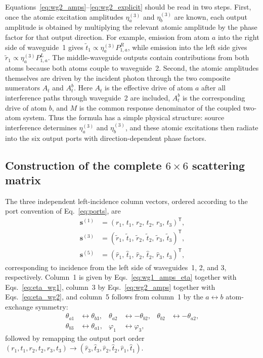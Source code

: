 \documentclass[aps,pra,reprint,superscriptaddress,nofootinbib,longbibliography,floatfix]{revtex4-2}
\newcommand{\ph}{\varphi}
\begin{document}
Equations~\eqref{eq:wg2_amps}--\eqref{eq:wg2_explicit} should be read in two steps.
First, once the atomic excitation amplitudes $\eta_a^{(3)}$ and $\eta_b^{(3)}$ are known, each output amplitude is obtained by multiplying the relevant atomic amplitude by the phase factor for that output direction.
For example, emission from atom $a$ into the right side of waveguide~1 gives $\tilde t_1\propto \eta_a^{(3)}P_{1,a}^{R}$, while emission into the left side gives $\tilde r_1\propto \eta_a^{(3)}P_{1,a}^{L}$.
The middle-waveguide outputs contain contributions from both atoms because both atoms couple to waveguide~2.
Second, the atomic amplitudes themselves are driven by the incident photon through the two composite numerators $A_t$ and $A_t^b$.
Here $A_t$ is the effective drive of atom $a$ after all interference paths through waveguide~2 are included, $A_t^b$ is the corresponding drive of atom $b$, and $M$ is the common response denominator of the coupled two-atom system.
Thus the formula has a simple physical structure: source interference determines $\eta_a^{(3)}$ and $\eta_b^{(3)}$, and these atomic excitations then radiate into the six output ports with direction-dependent phase factors.

\subsection{\texorpdfstring{Construction of the complete $6\times6$ scattering matrix}{Construction of the complete 6x6 scattering matrix}}

The three independent left-incidence column vectors, ordered according to the port convention of Eq.~\eqref{eq:ports}, are
\begin{equation}
\begin{aligned}
\mathbf{s}^{(1)} &= (r_1,\, t_1,\, r_2,\, t_2,\, r_3,\, t_3)^{\mathsf T},\\
\mathbf{s}^{(3)} &= (\tilde r_1,\, \tilde t_1,\, \tilde r_2,\, \tilde t_2,\, \tilde r_3,\, \tilde t_3)^{\mathsf T},\\
\mathbf{s}^{(5)} &= (\hat r_1,\, \hat t_1,\, \hat r_2,\, \hat t_2,\, \hat r_3,\, \hat t_3)^{\mathsf T},
\end{aligned}
\label{eq:three_cols}
\end{equation}
corresponding to incidence from the left side of waveguides~1, 2, and 3, respectively.
Column~1 is given by Eqs.~\eqref{eq:wg1_amps_eta} together with Eqs.~\eqref{eq:eta_wg1}, column~3 by Eqs.~\eqref{eq:wg2_amps} together with Eqs.~\eqref{eq:eta_wg2}, and column~5 follows from column~1 by the $a\leftrightarrow b$ atom-exchange symmetry:
\begin{equation}
\begin{aligned}
\theta_{a1}&\leftrightarrow\theta_{b3},&
\theta_{a2}&\leftrightarrow-\theta_{b2},&
\theta_{b2}&\leftrightarrow-\theta_{a2},\\
\theta_{b3}&\leftrightarrow\theta_{a1},&
\ph_1&\leftrightarrow\ph_3,
\end{aligned}
\label{eq:symmetry}
\end{equation}
followed by remapping the output port order $(r_1,t_1,r_2,t_2,r_3,t_3)\to(\hat r_3,\hat t_3,\hat r_2,\hat t_2,\hat r_1,\hat t_1)$.
\end{document}
